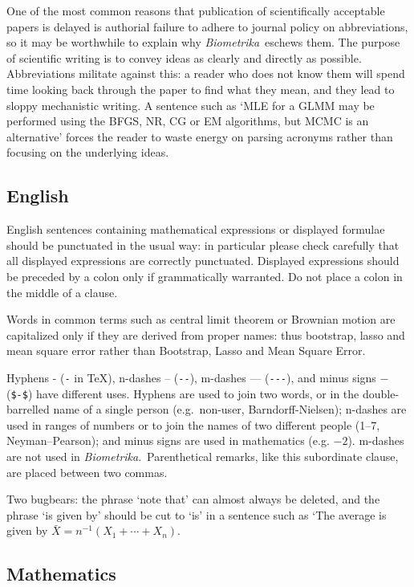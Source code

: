 \documentclass[article,lineno]{biometrika}
\def\Bka{{\it Biometrika}}
\begin{document}
One of the most common reasons that publication of scientifically acceptable papers is delayed is authorial  failure to adhere to journal policy on abbreviations, so it may be worthwhile to explain why \Bka\ eschews them. The purpose of scientific writing is to convey ideas as clearly and directly as possible.  Abbreviations militate against this: a reader who does not know them will spend time looking back through the paper to find what they mean, and they lead to sloppy mechanistic writing. A sentence such as `MLE for a GLMM may be performed using the BFGS, NR, CG or EM algorithms, but MCMC is an alternative' forces the reader to waste energy on parsing acronyms  rather than focusing on the underlying ideas.

\subsection{English}

English sentences containing mathematical expressions or displayed formulae should be punctuated in the usual way: in particular please check carefully that all displayed expressions are correctly punctuated.  Displayed expressions should be preceded by a colon only if grammatically warranted. Do not place a colon in the middle of a clause.

Words in common terms such as central limit theorem or Brownian motion are capitalized only if they are derived from proper names: thus bootstrap,  lasso and mean square error rather than Bootstrap, Lasso and  Mean Square Error.

Hyphens - (\verb+-+ in \TeX), n-dashes -- (\verb+--+), m-dashes --- (\verb+---+), and minus signs $-$ (\verb+$-$+) have different uses.  Hyphens are used to join two words, or in the double-barrelled name of a single person (e.g.\ non-user, Barndorff-Nielsen); n-dashes are used in ranges of numbers or to join the names of two different people (1--7, Neyman--Pearson); and minus signs are used in mathematics (e.g. $-2$). m-dashes are not used in \Bka.\  Parenthetical remarks, like this subordinate clause, are placed between two commas.

Two bugbears: the phrase `note that' can almost always be deleted, and the phrase `is given by' should be cut to `is' in a sentence such as `The average is given by $\bar X=n^{-1}(X_1+\cdots+X_n)$.

\subsection{Mathematics}
\end{document}
